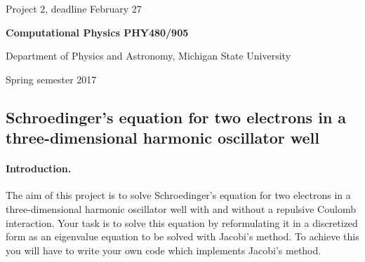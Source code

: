 \documentclass[%
oneside,                 %
final,                   %
10pt]{article}
\begin{document}

\newcommand{\exercisesection}[1]{\subsection*{#1}}






\thispagestyle{empty}

\begin{center}
{\LARGE\bf
\begin{spacing}{1.25}
Project 2, deadline  February 27
\end{spacing}
}
\end{center}


\begin{center}
{\bf Computational Physics PHY480/905}
\end{center}

    \begin{center}
\centerline{{\small Department of Physics and Astronomy, Michigan State University}}
\end{center}
    

\begin{center}
Spring semester 2017
\end{center}

\vspace{1cm}


\subsection*{Schroedinger's equation for two electrons in a three-dimensional harmonic oscillator well}

\paragraph{Introduction.}
The aim of this project is to solve Schroedinger's equation for two
electrons in a three-dimensional harmonic oscillator well with and
without a repulsive Coulomb interaction.  Your task is to solve this
equation by reformulating it in a discretized form as an eigenvalue
equation to be solved with Jacobi's method. To achieve this you will
have to write your own code which implements Jacobi's method.
\end{document}
